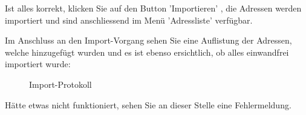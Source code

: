 Ist alles korrekt, klicken Sie auf den Button 'Importieren' , die Adressen werden importiert und sind anschliessend im Menü 'Adressliste' verfügbar. 

\vspace{\baselineskip}

Im Anschluss an den Import-Vorgang sehen Sie eine Auflistung der Adressen, welche hinzugefügt wurden und es ist ebenso ersichtlich, ob alles einwandfrei importiert wurde:

\begin{figure}[H]
\caption{Import-Protokoll}
\end{figure}

Hätte etwas nicht funktioniert, sehen Sie an dieser Stelle eine Fehlermeldung.